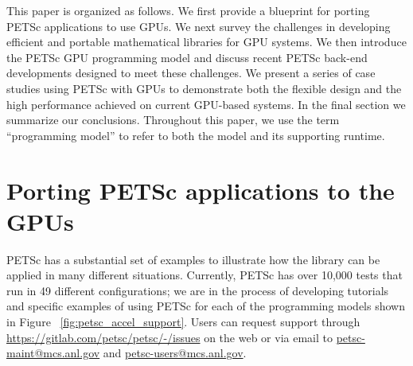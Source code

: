\documentclass[10pt,journal,compsoc]{IEEEtran}
\begin{document}
This paper is organized as follows.
We first %
provide a blueprint for porting PETSc
applications to use GPUs. We next survey the challenges in developing efficient and portable mathematical
libraries for GPU systems.
We then introduce the PETSc GPU programming
model and discuss recent PETSc back-end developments designed to meet
these challenges.
We present a series of case studies using PETSc with GPUs to demonstrate both the 
flexible design and the high performance achieved 
on current GPU-based systems. In the final section we summarize our conclusions.
Throughout this paper, we use the term ``programming model'' to refer to
both the model and its supporting runtime.
 
\section{Porting PETSc applications to the GPUs}
\label{sec:petsc_port}



PETSc has a substantial set of examples to illustrate how the library can be applied in many
different situations.
Currently, PETSc has over 10,000 tests that run in 49 different
configurations; we are in the process of developing tutorials and specific examples  
of using PETSc for each of the programming models shown in Figure ~\ref{fig:petsc_accel_support}.
Users can request support through \url{https://gitlab.com/petsc/petsc/-/issues} on the web or via email to \url{petsc-maint@mcs.anl.gov} and \url{petsc-users@mcs.anl.gov}.

\end{document}
